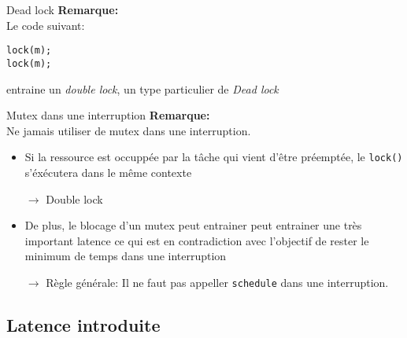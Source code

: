 \begin{frame}[fragile]{Dead lock}
  \textbf{Remarque:} \\
  Le code suivant:
  \begin{lstlisting} 
lock(m);
lock(m); 
  \end{lstlisting} 
  entraine un  \emph{double lock},  un type particulier  de \emph{Dead
    lock}
\end{frame} 

\begin{frame}[fragile]{Mutex dans une interruption}
  \textbf{Remarque:} \\
  Ne jamais utiliser de mutex dans une interruption.
  \begin{itemize} 
  \item Si  la ressource  est occuppée par  la tâche qui  vient d'être
    préemptée, le \texttt{lock()} s'éxécutera dans le même contexte
  \item[$\rightarrow$] Double lock
  \item De plus,  le blocage d'un mutex peut  entrainer peut entrainer
    une  très  important latence  ce  qui  est  en contradiction  avec
    l'objectif de rester le minimum de temps dans une interruption
  \item[$\rightarrow$] Règle générale: Il ne faut pas appeller \texttt{schedule} dans une interruption.
  \end{itemize} 
\end{frame} 

\subsection{Latence introduite}

